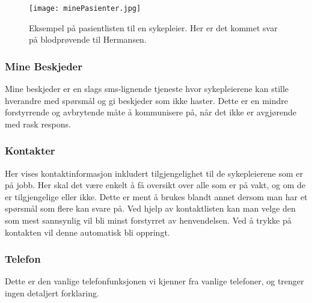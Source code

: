 \begin{figure}[H]
\centering
\texttt{[image: minePasienter.jpg]}
\caption{Eksempel på pasientlisten til en sykepleier. Her er det kommet svar på blodprøvende til Hermansen.}
\label{minePasienter}
\end{figure}

\subsubsection{Mine Beskjeder}
Mine beskjeder er en slags sms-lignende tjeneste hvor sykepleierene kan stille hverandre med spørsmål og gi beskjeder som ikke haster. Dette er en mindre forstyrrende og avbrytende måte å kommunisere på, når det ikke er avgjørende med rask respons.

\subsubsection{Kontakter}
Her vises kontaktinformasjon inkludert tilgjengelighet til de sykepleierene som er på jobb. Her skal det være enkelt å få oversikt over alle som er på vakt, og om de er tilgjengelige eller ikke. Dette er ment å brukes blandt annet dersom man har et spørsmål som flere kan svare på. Ved hjelp av kontaktlisten kan man velge den som mest sannsynlig vil bli minst forstyrret av henvendelsen. Ved å trykke på kontakten vil denne automatisk bli oppringt.

\subsubsection{Telefon}
Dette er den vanlige telefonfunksjonen vi kjenner fra vanlige telefoner, og trenger ingen detaljert forklaring.



